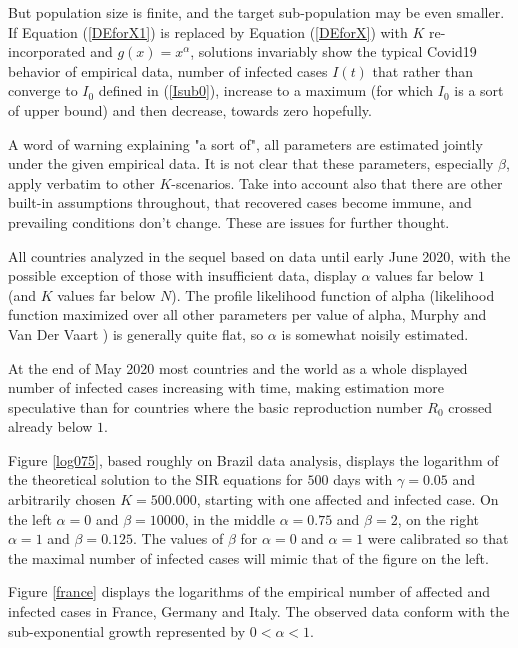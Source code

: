 \documentclass{article}
\begin{document}
\bigskip

But population size is finite, and the target sub-population may be even smaller. If Equation (\ref{DEforX1}) is replaced by Equation (\ref{DEforX}) with $K$ re-incorporated and $g(x)=x^\alpha$, solutions invariably show the typical Covid19 behavior of empirical data, number of infected cases $I(t)$ that rather than converge to $I_0$ defined in (\ref{Isub0}), increase to a maximum (for which $I_0$ is a sort of upper bound) and then decrease, towards zero hopefully.

A word of warning explaining "a sort of", all parameters are estimated jointly under the given empirical data. It is not clear that these parameters, especially $\beta$, apply verbatim to other \linebreak $K$-scenarios. Take into account also that there are other built-in assumptions throughout, that recovered cases become immune, and prevailing conditions don't change. These are issues for further thought.

All countries analyzed in the sequel based on data until early June 2020, with the possible exception of those with insufficient data, display $\alpha$ values far below $1$ (and $K$ values far below $N$). The profile likelihood function of alpha (likelihood function maximized over all other parameters per value of alpha, Murphy and Van Der Vaart \cite{Murphy}) is generally quite flat, so $\alpha$ is somewhat noisily estimated.

At the end of May 2020 most countries and the world as a whole displayed number of infected cases increasing with time, making estimation more speculative than for countries where the basic reproduction number $R_0$ crossed already below $1$.

\bigskip

Figure \ref{log075}, based roughly on Brazil data analysis, displays the logarithm of the theoretical solution to the SIR equations for $500$ days with $\gamma=0.05$ and arbitrarily chosen $K=500.000$, starting with one affected and infected case. On the left $\alpha=0$ and $\beta=10000$, in the middle $\alpha=0.75$ and $\beta=2$, on the right $\alpha=1$ and $\beta=0.125$. The values of $\beta$ for $\alpha=0$ and $\alpha=1$ were calibrated so that the maximal number of infected cases will mimic that of the figure on the left.

Figure \ref{france} displays the logarithms of the empirical number of affected and infected cases in France, Germany and Italy. The observed data conform with the sub-exponential growth represented by $0<\alpha<1$.
\end{document}
